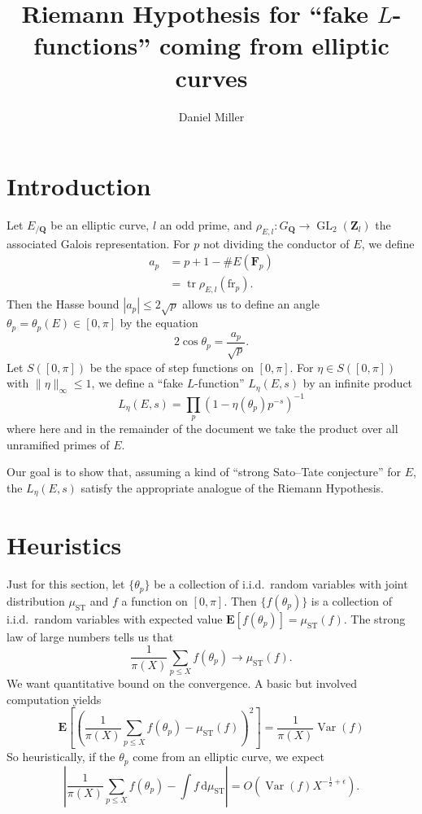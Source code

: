 \documentclass{article}
\title{Riemann Hypothesis for ``fake $L$-functions'' coming from elliptic curves}
\author{Daniel Miller}
\DeclareMathOperator{\GL}{GL}
\DeclareMathOperator{\tr}{tr}
\DeclareMathOperator{\Var}{Var}
\newcommand{\bE}{\mathbf{E}}
\newcommand{\bF}{\mathbf{F}}
\newcommand{\bQ}{\mathbf{Q}}
\newcommand{\bZ}{\mathbf{Z}}
\newcommand{\dd}{\mathrm{d}}
\newcommand{\fr}{\mathrm{fr}}
\newcommand{\ST}{\mathrm{ST}}
\numberwithin{theorem}{section}
\begin{document}
\maketitle





\section{Introduction}

Let $E_{/\bQ}$ be an elliptic curve, $l$ an odd prime, and 
$\rho_{E,l}:G_\bQ\to \GL_2(\bZ_l)$ the associated Galois representation. 
For $p$ not dividing the conductor of $E$, we define 
\begin{align*}
	a_p &= p+1-\# E(\bF_p) \\
		&= \tr \rho_{E,l}(\fr_p) .
\end{align*}
Then the Hasse bound $|a_p|\leqslant 2\sqrt p$ allows us to define an angle 
$\theta_p=\theta_p(E)\in [0,\pi]$ by the equation 
\[
	2\cos \theta_p = \frac{a_p}{\sqrt p} .
\]
Let $S([0,\pi])$ be the space of step functions on $[0,\pi]$. For 
$\eta\in S([0,\pi])$ with $\|\eta\|_\infty\leqslant 1$, we define a ``fake 
$L$-function'' $L_\eta(E,s)$ by an infinite product 
\[
	L_\eta(E,s) = \prod_p \left(1-\eta(\theta_p) p^{-s}\right)^{-1}
\]
where here and in the remainder of the document we take the product over all 
unramified primes of $E$. 

Our goal is to show that, assuming a kind of ``strong Sato--Tate conjecture'' 
for $E$, the $L_\eta(E,s)$ satisfy the appropriate analogue of the Riemann 
Hypothesis. 





\section{Heuristics}

Just for this section, let $\{\theta_p\}$ be a collection of i.i.d.~random 
variables with joint distribution $\mu_\ST$ and $f$ a function on $[0,\pi]$. 
Then $\{f(\theta_p)\}$ is a collection of i.i.d.~random variables with 
expected value $\bE[f(\theta_p)] = \mu_\ST(f)$. The strong law of large 
numbers tells us that 
\[
	\frac{1}{\pi(X)} \sum_{p\leqslant X} f(\theta_p) \to \mu_\ST(f) .
\]
We want quantitative bound on the convergence. A basic but involved computation 
yields 
\[
	\bE\left[\left(\frac{1}{\pi(X)} \sum_{p\leqslant X} f(\theta_p) - \mu_\ST(f)\right)^2\right] 
	= \frac{1}{\pi(X)} \Var(f)
\]
So heuristically, if the $\theta_p$ come from an elliptic curve, we expect 
\[
	\left| \frac{1}{\pi(X)} \sum_{p\leqslant X} f(\theta_p) - \int f\, \dd \mu_\ST\right| = O\left(\Var(f) X^{-\frac 1 2+\epsilon}\right) .
\]
\end{document}
